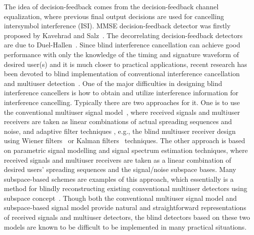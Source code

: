 \documentclass[a4paper,10pt,fleqn, twocolumn]{IEEETran}
\begin{document}
The idea of decision-feedback comes from the decision-feedback
channel equalization, where previous final output decisions are
used for cancelling intersymbol interference (ISI). MMSE
decision-feedback detector was firstly proposed by Kavehrad and
Salz~\cite{Kave85}. The decorrelating decision-feedback detectors
are due to Duel-Hallen~\cite{Duel93,Duel95}. Since blind
interference cancellation can achieve good performance with only
the knowledge of the timing and signature waveform of desired
user(s) and it is much closer to practical applications, recent
research has been devoted to blind implementation of conventional
interference cancellation and multiuser
detection~\cite{Madh94,Honi95,Torl97,Wang98,Wang99,Zhang02}. One
of the major difficulties in designing blind interference
cancellers is how to obtain and utilize interference information
for interference cancelling. Typically there are two approaches
for it. One is to use the conventional multiuser signal
model~\cite{Verd98}, where received signals and multiuser
receivers are taken as linear combinations of actual spreading
sequences and noise, and adaptive filter techniques , e.g., the
blind multiuser receiver design using Wiener
filters~\cite{Madh94,Honi95} or Kalman filters~\cite{Zhang02}
techniques. The other approach is based on parametric signal
modelling and signal spectrum estimation techniques, where
received signals and multiuser receivers are taken as a linear
combination of desired users' spreading sequences and the
signal/noise subspace bases. Many subspace-based schemes are
examples of this approach, which essentially is a method for
blindly reconstructing existing conventional multiuser detectors
using subspace concept~\cite{Wang98,Wang99}. Though both the
conventional multiuser signal model and subspace-based signal
model provide natural and straightforward representations of
received signals and multiuser detectors, the blind detectors
based on these two models are known to be difficult to be
implemented in many practical situations.
\end{document}
